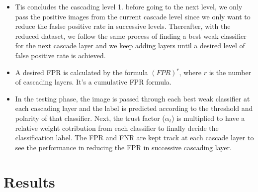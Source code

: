 \documentclass{article}
\begin{document}
\begin{itemize}
\item Tis concludes the cascading level 1. before going to the next level, we only pass the positive images from the current cascade level since we only want to reduce the faslse positive rate in successive levels. Thereafter, with the reduced dataset, we follow the same process of finding a best weak classifier for the next cascade layer and we keep adding layers until a desired level of false positive rate is achieved.
\item A desired FPR is calculated by the formula $(FPR)^r$, where $r$ is the number of cascading layers. It's a cumulative FPR formula.
\item In the testing phase, the image is passed through each best weak classifier at each cascading layer and the label is predicted according to the threshold and polarity of that classifier. Next, the trust factor ($\alpha_t$) is multiplied to have a relative weight cotribution from each classifier to finally decide the classification label. The FPR and FNR are kept track at each cascade layer to see the performance in reducing the FPR in successive  cascading layer.
\end{itemize}


\section{Results}
\end{document}
